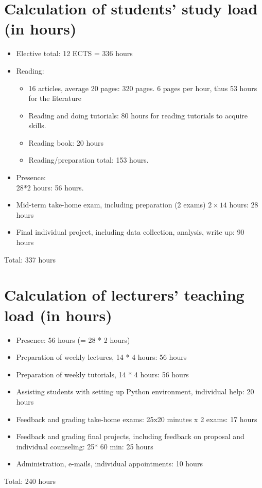 \documentclass[a4paper,12pt]{report}
\begin{document}
\chapter{Calculation of students' study load (in hours)}
\begin{itemize}

\item Elective total: 12 ECTS = 336 hours
\item Reading: 
\begin{itemize}
\item 16 articles, average 20 pages: 320 pages. 6 pages per hour, thus 53 hours for the literature
\item Reading and doing tutorials: 80 hours for reading tutorials to acquire skills.
\item Reading book: 20 hours
\item Reading/preparation total: 153 hours.
\end{itemize}
\item Presence: \\28*2 hours: 56 hours.
\item Mid-term take-home exam, including preparation (2 exams) $2 \times 14$ hours: 28 hours
\item Final individual project, including data collection, analysis, write up: 90 hours
\end{itemize}

Total: 337 hours



\chapter{Calculation of lecturers' teaching load (in hours)}
\begin{itemize}
\item Presence: 56 hours (= 28 * 2 hours)
\item Preparation of weekly lectures, 14 * 4 hours: 56 hours
\item Preparation of weekly tutorials, 14 * 4 hours: 56 hours
\item Assisting students with setting up Python environment, individual help: 20 hours
\item Feedback and grading take-home exams: 25x20 minutes x 2 exams: 17 hours
\item Feedback and grading final projects, including feedback on proposal and individual counseling: 25* 60 min: 25 hours 
\item Administration, e-mails, individual appointments: 10 hours
\end{itemize}
Total: 240 hours
\end{document}
